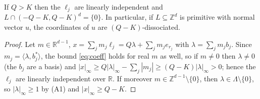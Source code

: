\documentclass[12pt]{article}
\newcommand{\Z}{\mathbb{Z}}
\newcommand{\R}{\mathbb{R}}
\newcommand{\dcube}[1]{(-#1,#1)}
\newcommand{\Lat}{\Lambda}
\begin{document}
\begin{lemma}\label{lem:cube}
If $Q>K$ then the $\ell_j$ are linearly independent and $L\cap\dcube{Q-K}^d=\{0\}$. In particular, if $L\subseteq\Z^d$
is primitive with normal vector $u$, the coordinates of $u$ are $(Q-K)$-dissociated.
\end{lemma}
\begin{proof}
Let $m\in\R^{d-1}$, $x=\sum_jm_j\ell_j=Q\lambda+\sum_jm_je_{r_j}$ with $\lambda=\sum_jm_jb_j$. Since $m_j=\langle\lambda,b_j^*\rangle$,
the bound \eqref{eq:coeff} holds for real $m$ as well, so if $m\ne0$ then $\lambda\ne0$ (the $b_j$ are a basis) and
$|x|_\infty\ge Q|\lambda|_\infty-\sum_j|m_j|\ge(Q-K)|\lambda|_\infty>0$; hence the $\ell_j$ are linearly independent over $\R$.
If moreover $m\in\Z^{d-1}\setminus\{0\}$, then $\lambda\in\Lat\setminus\{0\}$, so $|\lambda|_\infty\ge1$ by (A1) and
$|x|_\infty\ge Q-K$.
\end{proof}
\end{document}
